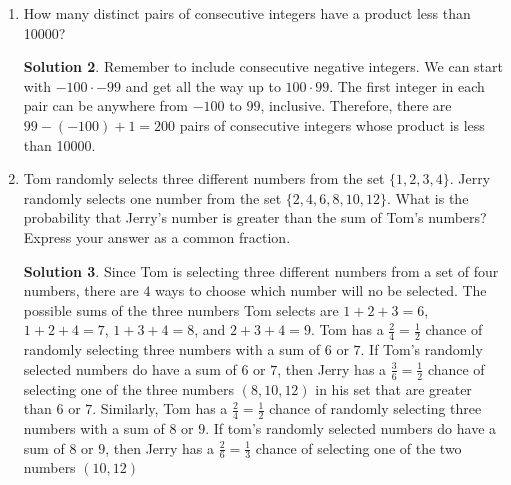 \documentclass{article}
\theoremstyle{definition}
\newtheorem*{solution}{Solution}
\begin{document}
\begin{enumerate}
\begin{enumerate}
\begin{solution}
                    Alternatively, we can compute the perimeter of the fence, 
                    which is $2(60 + 30) = 180$. The fence posts divide this 
                    perimeter into three yard sections, and since the fence is a 
                    cycle, each section corresponds to one fence post.  
                    Therefore, there are $\frac{180}{3} = 60$ fence posts.
                \end{solution}
        \end{enumerate}
    \item How many distinct pairs of consecutive integers have a product less 
        than \num{10000}?
        \begin{solution}
            Remember to include consecutive negative integers. We can start with 
            $-100 \cdot -99$ and get all the way up to $100 \cdot 99$. The first 
            integer in each pair can be anywhere from $-100$ to $99$, inclusive.  
            Therefore, there are $99 - (-100) + 1 = 200$ pairs of consecutive 
            integers whose product is less than \num{10000}.
        \end{solution}
    \item Tom randomly selects three different numbers from the set $\{1, 2, 3, 
        4\}$. Jerry randomly selects one number from the set $\{2, 4, 6, 8 ,10, 
        12\}$. What is the probability that Jerry's number is greater than the 
        sum of Tom's numbers? Express your answer as a common fraction.
        \begin{solution}
            Since Tom is selecting three different numbers from a set of four 
            numbers, there are $4$ ways to choose which number will no be 
            selected. The possible sums of the three numbers Tom selects are $1 
            + 2 + 3 = 6$, $1 + 2 + 4 = 7$, $1 + 3 + 4 = 8$, and $2 + 3 + 4 = 9$.  
            Tom has a $\frac{2}{4} = \frac{1}{2}$ chance of randomly selecting 
            three numbers with a sum of $6$ or $7$. If Tom's randomly selected 
            numbers do have a sum of $6$ or $7$, then Jerry has a $\frac{3}{6} = 
            \frac{1}{2}$ chance of selecting one of the three numbers $(8, 10, 
            12)$ in his set that are greater than $6$ or $7$.  Similarly, Tom 
            has a $\frac{2}{4} = \frac{1}{2}$ chance of randomly selecting three 
            numbers with a sum of $8$ or $9$. If tom's randomly selected numbers 
            do have a sum of $8$ or $9$, then Jerry has a $\frac{2}{6} = 
            \frac{1}{3}$ chance of selecting one of the two numbers $(10, 12)$ 

\end{solution}
\end{enumerate}
\end{document}
